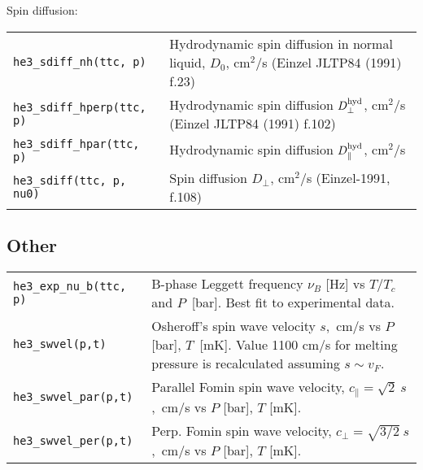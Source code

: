 \documentclass[a4paper]{article}
\begin{document}
Spin diffusion:

\medskip
\noindent\begin{tabular}{lp{12.5cm}}
\tt he3\_sdiff\_nh(ttc, p)    & Hydrodynamic spin diffusion in normal liquid, $D_0$, cm$^2$/s\newline
                              {\small (Einzel JLTP84 (1991) f.23)}\\
\tt he3\_sdiff\_hperp(ttc, p) & Hydrodynamic spin diffusion $D_\perp^{\rm hyd}$, cm$^2$/s
                              {(\small Einzel JLTP84 (1991) f.102)}\\
\tt he3\_sdiff\_hpar(ttc, p)  & Hydrodynamic spin diffusion $D_\parallel^{\rm hyd}$, cm$^2$/s\\
\tt he3\_sdiff(ttc, p, nu0)   & Spin diffusion $D_\perp$, cm$^2$/s
                              {\small(Einzel-1991, f.108)}\\
\end{tabular}
\medskip


\subsection*{Other}

\medskip
\noindent\begin{tabular}{lp{12.5cm}}
\tt he3\_exp\_nu\_b(ttc, p)     &B-phase Leggett frequency $\nu_B$ [Hz] vs
                                 $T/T_c$ and $P$~[bar].\newline
                                  Best fit to experimental data.\\
\tt he3\_swvel(p,t) & Osheroff's spin wave velocity $s$,~cm/s
                      vs $P$ [bar], $T$~[mK]. Value 1100 cm/s for
                      melting pressure is recalculated assuming $s\sim v_F$.\\
\tt he3\_swvel\_par(p,t) & Parallel Fomin spin wave velocity,\newline
                          $c_\parallel = \sqrt{2}\ s$,~cm/s vs $P$ [bar], $T$ [mK].\\
\tt he3\_swvel\_per(p,t) & Perp. Fomin spin wave velocity,\newline
                          $c_\perp = \sqrt{3/2}\ s$,~cm/s vs $P$ [bar], $T$ [mK].\\

\end{tabular}
\medskip

\end{document}
